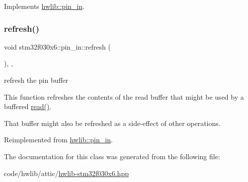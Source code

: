 Implements \hyperlink{classhwlib_1_1pin__in_ad071bd2e17bb4af51390f6cbb728a194}{hwlib\+::pin\+\_\+in}.

\mbox{\label{classstm32f030x6_1_1pin__in_a8d213fc447b0c7e8acf5f331f1c85683}} 
\subsubsection{\texorpdfstring{refresh()}{refresh()}}
{\footnotesize\ttfamily void stm32f030x6\+::pin\+\_\+in\+::refresh (\begin{DoxyParamCaption}{ }\end{DoxyParamCaption})\hspace{0.3cm}{\ttfamily [inline]}, {\ttfamily [override]}, {\ttfamily [virtual]}}





refresh the pin buffer

This function refreshes the contents of the read buffer that might be used by a buffered \hyperlink{classstm32f030x6_1_1pin__in_a930e692fe61caf9724c53ac9f0577432}{read()}.

That buffer might also be refreshed as a side-\/effect of other operations. 

Reimplemented from \hyperlink{classhwlib_1_1pin__in_a3fb1bfb1ec962bb6d31a5e865f0d0acb}{hwlib\+::pin\+\_\+in}.



The documentation for this class was generated from the following file\+:\begin{DoxyCompactItemize}
\item 
code/hwlib/attic/\hyperlink{hwlib-stm32f030x6_8hpp}{hwlib-\/stm32f030x6.\+hpp}\end{DoxyCompactItemize}
